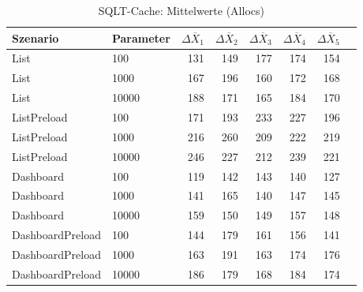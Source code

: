 
\begin{table}[ht]
\setlength{\extrarowheight}{-1pt}
\centering
\caption{SQLT-Cache: Mittelwerte (Allocs)}
\begin{tabular}{llrrrrrr}
\toprule
Szenario & Parameter & ${\Delta \overline{X}_1}$ & ${\Delta \overline{X}_2}$ & ${\Delta \overline{X}_3}$ & ${\Delta \overline{X}_4}$ & ${\Delta \overline{X}_5}$ \\
\midrule
	List & 100 & 131 & 149 & 177 & 174 & 154 \\
	List & 1000 & 167 & 196 & 160 & 172 & 168 \\
	List & 10000 & 188 & 171 & 165 & 184 & 170 \\
	ListPreload & 100 & 171 & 193 & 233 & 227 & 196 \\
	ListPreload & 1000 & 216 & 260 & 209 & 222 & 219 \\
	ListPreload & 10000 & 246 & 227 & 212 & 239 & 221 \\
	Dashboard & 100 & 119 & 142 & 143 & 140 & 127 \\
	Dashboard & 1000 & 141 & 165 & 140 & 147 & 145 \\
	Dashboard & 10000 & 159 & 150 & 149 & 157 & 148 \\
	DashboardPreload & 100 & 144 & 179 & 161 & 156 & 141 \\
	DashboardPreload & 1000 & 163 & 191 & 163 & 174 & 176 \\
	DashboardPreload & 10000 & 186 & 179 & 168 & 184 & 174 \\
\bottomrule
\end{tabular}
\label{tab:mittelwerte_sqlt-cache_allocs}
\end{table}
	